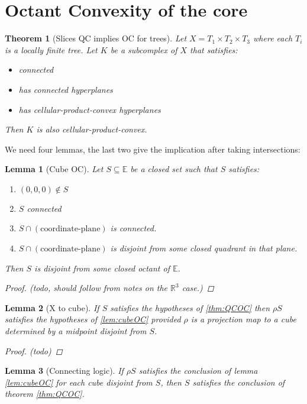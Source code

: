 \documentclass{article}
\theoremstyle{mystyle}
\newtheorem{thm}{Theorem}[section]
\newtheorem{lem}{Lemma}[section]
\theoremstyle{remark}
\begin{document}
\section{Octant Convexity of the core}%
\begin{thm}
    [\label{thm:QCOC}Slices QC implies OC for trees]
	Let \(X=T_{1} \times T_{2} \times T_{3}\) where each \(T_{i}\) is a locally finite tree. Let \(K\) be a subcomplex of \(X\) that satisfies: 
	\begin{itemize}
		\item connected
		\item has connected hyperplanes
		\item has cellular-product-convex hyperplanes 
	\end{itemize}
Then \(K\) is also cellular-product-convex.
\end{thm}
We need four lemmas, the last two give the implication after taking intersections:

\begin{lem}
	[\label{lem:cubeOC}Cube OC] Let \(S \subseteq \mathbb{E}  \) be a closed set such that \(S\) satisfies: 
	\begin{enumerate}
		\item \((0,0,0) \not\in S\) 
		\item \(S\) connected
		\item \(S \cap (\text{coordinate-plane})\) is connected.
		\item \(S \cap (\text{coordinate-plane})\) is disjoint from some closed quadrant in that plane.
	\end{enumerate}
	Then \(S\) is disjoint from some closed octant of \(\mathbb{E}\). 
	\begin{proof}
		(todo, should follow from notes on the \(\mathbb{R}^{3}\) case.)
	\end{proof}
\end{lem}

\begin{lem}
	[\label{lem:Xtocube}X to cube]
	If \(S\) satisfies the hypotheses of \ref{thm:QCOC} then \(\rho S\) satisfies the hypotheses of \ref{lem:cubeOC} provided \(\rho\) is a projection map to a cube determined by a midpoint disjoint from \(S\).
\begin{proof}
	(todo)	
\end{proof}
\end{lem}

\begin{lem}
	[Connecting logic]
	If \(\rho S\) satisfies the conclusion of lemma \ref{lem:cubeOC} for each cube disjoint from \(S\), then \(S\) satisfies the conclusion of theorem \ref{thm:QCOC}.
\end{lem}%
\end{document}
